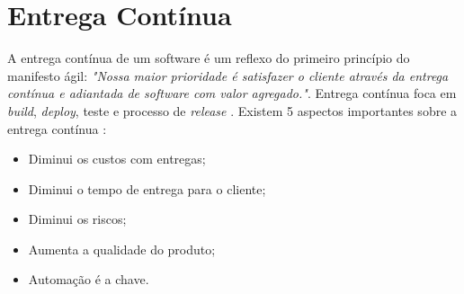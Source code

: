 \section{Entrega Contínua}

A entrega contínua de um software é um reflexo do primeiro princípio do manifesto ágil: \textit{"Nossa maior prioridade é satisfazer o cliente através da entrega contínua e adiantada de software com valor agregado."}\cite{manifesto}. Entrega contínua foca em \textit{build}, \textit{deploy}, teste e processo de \textit{release} \cite{livro-deploy-continuo}.
Existem 5 aspectos importantes sobre a entrega contínua \cite{network-world}:
\begin{itemize}
    \item Diminui os custos com entregas;
    \item Diminui o tempo de entrega para o cliente;
    \item Diminui os riscos;
    \item Aumenta a qualidade do produto;
    \item Automação é a chave.
\end{itemize}
